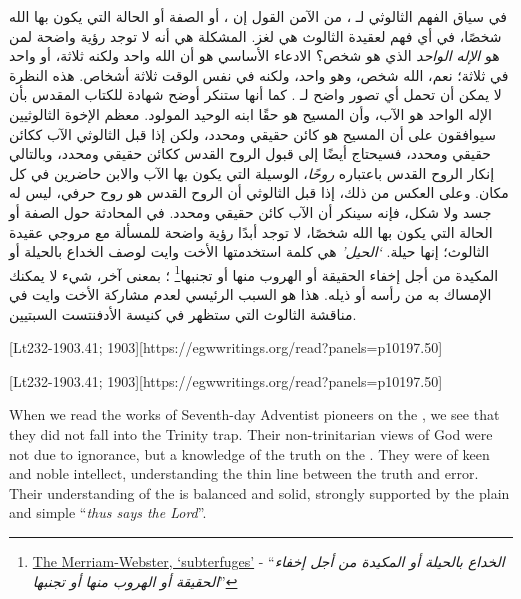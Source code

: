 في سياق الفهم الثالوثي لـ ، من الآمن القول إن ، أو الصفة أو الحالة التي يكون بها الله شخصًا، في أي فهم لعقيدة الثالوث هي لغز. المشكلة هي أنه لا توجد رؤية واضحة لمن هو \textit{الإله الواحد} الذي هو شخص؟ الادعاء الأساسي هو أن الله واحد ولكنه ثلاثة، أو واحد في ثلاثة؛ نعم، الله شخص، وهو واحد، ولكنه في نفس الوقت ثلاثة أشخاص. هذه النظرة لا يمكن أن تحمل أي تصور واضح لـ . كما أنها ستنكر أوضح شهادة للكتاب المقدس بأن الإله الواحد هو الآب، وأن المسيح هو حقًا ابنه الوحيد المولود. معظم الإخوة الثالوثيين سيوافقون على أن المسيح هو كائن حقيقي ومحدد، ولكن إذا قبل الثالوثي الآب ككائن حقيقي ومحدد، فسيحتاج أيضًا إلى قبول الروح القدس ككائن حقيقي ومحدد، وبالتالي إنكار الروح القدس باعتباره \textit{روحًا}، الوسيلة التي يكون بها الآب والابن حاضرين في كل مكان. وعلى العكس من ذلك، إذا قبل الثالوثي أن الروح القدس هو روح حرفي، ليس له جسد ولا شكل، فإنه سينكر أن الآب كائن حقيقي ومحدد. في المحادثة حول الصفة أو الحالة التي يكون بها الله شخصًا، لا توجد أبدًا رؤية واضحة للمسألة مع مروجي عقيدة الثالوث؛ إنها حيلة. \textit{‘الحيل’} هي كلمة استخدمتها الأخت وايت لوصف الخداع بالحيلة أو المكيدة من أجل إخفاء الحقيقة أو الهروب منها أو تجنبها\footnote{\href{https://www.merriam-webster.com/dictionary/subterfuges}{The Merriam-Webster, ‘subterfuges’} - “\textit{الخداع بالحيلة أو المكيدة من أجل إخفاء الحقيقة أو الهروب منها أو تجنبها}”} ؛ بمعنى آخر، شيء لا يمكنك الإمساك به من رأسه أو ذيله. هذا هو السبب الرئيسي لعدم مشاركة الأخت وايت في مناقشة الثالوث التي ستظهر في كنيسة الأدفنتست السبتيين.


[Lt232-1903.41; 1903][https://egwwritings.org/read?panels=p10197.50]


[Lt232-1903.41; 1903][https://egwwritings.org/read?panels=p10197.50]


When we read the works of Seventh-day Adventist pioneers on the , we see that they did not fall into the Trinity trap. Their non-trinitarian views of God were not due to ignorance, but a knowledge of the truth on the . They were of keen and noble intellect, understanding the thin line between the truth and error. Their understanding of the  is balanced and solid, strongly supported by the plain and simple “\textit{thus says the Lord}”.


